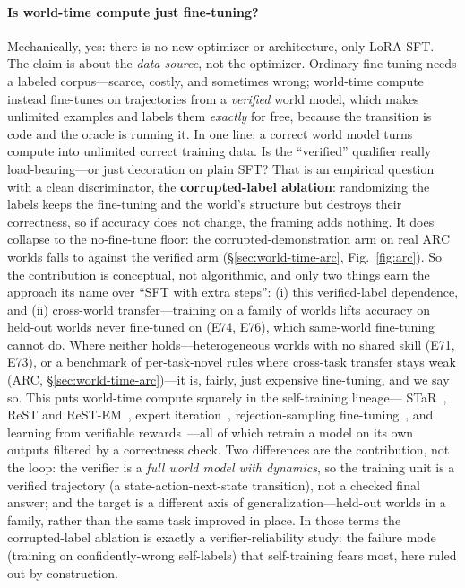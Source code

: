 \documentclass[11pt]{article}
\begin{document}
\paragraph{Is world-time compute just fine-tuning?} Mechanically, yes: there is no new
optimizer or architecture, only LoRA-SFT. The claim is about the \emph{data source}, not
the optimizer. Ordinary fine-tuning needs a labeled corpus---scarce, costly, and sometimes
wrong; world-time compute instead fine-tunes on trajectories from a \emph{verified} world
model, which makes unlimited examples and labels them \emph{exactly} for free, because the
transition is code and the oracle is running it. In one line: a correct world model turns
compute into unlimited correct training data. Is the ``verified'' qualifier really
load-bearing---or just decoration on plain SFT? That is an empirical question with a clean
discriminator, the \textbf{corrupted-label ablation}: randomizing the labels keeps the
fine-tuning and the world's structure but destroys their correctness, so if accuracy does not
change, the framing adds nothing. It does collapse to the no-fine-tune floor: the
corrupted-demonstration arm on real ARC worlds falls to \ArcTTTCorrupt{} against the verified
arm (\S\ref{sec:world-time-arc}, Fig.~\ref{fig:arc}). So the contribution
is conceptual, not algorithmic, and only two
things earn the approach its name over ``SFT with extra steps'': (i) this verified-label
dependence, and (ii) cross-world transfer---training on a family of worlds lifts
accuracy on held-out worlds never fine-tuned on (E74, E76), which same-world
fine-tuning cannot do. Where neither holds---heterogeneous worlds with no shared skill
(E71, E73), or a benchmark of per-task-novel rules where cross-task transfer stays weak
(ARC, \S\ref{sec:world-time-arc})---it is, fairly, just expensive fine-tuning, and we say so.
This puts world-time compute squarely in the self-training lineage---%
STaR~\cite{star2022}, ReST and ReST-EM~\cite{rest2023,restem2024}, expert
iteration~\cite{expertiteration2017}, rejection-sampling fine-tuning~\cite{rft2023}, and
learning from verifiable rewards~\cite{rlvr2024}---all of which retrain a model on its own
outputs filtered by a correctness check. Two differences are the contribution, not the loop:
the verifier is a \emph{full world model with dynamics}, so the training unit is a verified
trajectory (a state-action-next-state transition), not a checked final answer; and the
target is a different axis of generalization---held-out worlds in a family, rather
than the same task improved in place. In those terms the corrupted-label ablation is exactly
a verifier-reliability study: the failure mode (training on confidently-wrong self-labels) that
self-training fears most, here ruled out by construction.
\end{document}
